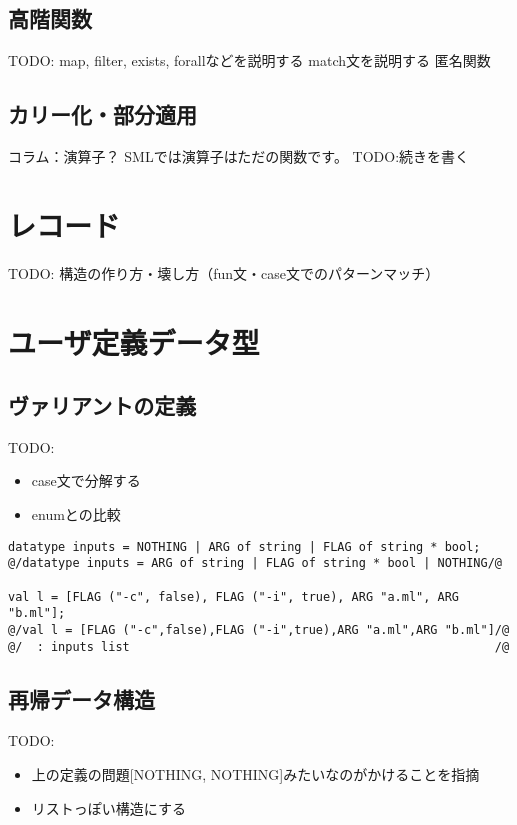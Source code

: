 \documentclass[11pt,a4paper]{article}
\begin{document}
\subsection{高階関数}
TODO:
map, filter, exists, forallなどを説明する
match文を説明する
匿名関数

\subsection{カリー化・部分適用}
\begin{itembox}[l]{コラム：演算子？}
  SMLでは演算子はただの関数です。
  TODO:続きを書く

\end{itembox}

\section{レコード}
TODO:
構造の作り方・壊し方（fun文・case文でのパターンマッチ）

\section{ユーザ定義データ型}
\subsection{ヴァリアントの定義}
TODO:
\begin{itemize}
\item case文で分解する
\item enumとの比較
\end{itemize}

\begin{lstlisting}[caption=単純なヴァリアント,label=code:variants]
datatype inputs = NOTHING | ARG of string | FLAG of string * bool;
@/datatype inputs = ARG of string | FLAG of string * bool | NOTHING/@

val l = [FLAG ("-c", false), FLAG ("-i", true), ARG "a.ml", ARG "b.ml"];
@/val l = [FLAG ("-c",false),FLAG ("-i",true),ARG "a.ml",ARG "b.ml"]/@
@/  : inputs list                                                   /@
\end{lstlisting}

\subsection{再帰データ構造}
TODO:
\begin{itemize}
\item 上の定義の問題[NOTHING, NOTHING]みたいなのがかけることを指摘
\item リストっぽい構造にする
\end{itemize}
\end{document}
